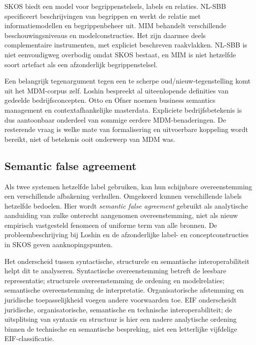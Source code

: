 SKOS biedt een model voor begrippenstelsels, labels en relaties. NL-SBB specificeert beschrijvingen van begrippen en werkt de relatie met informatiemodellen en begrippenbeheer uit. MIM behandelt verschillende beschouwingsniveaus en modelconstructies. Het zijn daarmee deels complementaire instrumenten, met expliciet beschreven raakvlakken. NL-SBB is niet eenvoudigweg overbodig omdat SKOS bestaat, en MIM is niet hetzelfde soort artefact als een afzonderlijk begrippenstelsel. \parencite{S31,S14,S13}

Een belangrijk tegenargument tegen een te scherpe oud/nieuw-tegenstelling komt uit het MDM-corpus zelf. Loshin bespreekt al uiteenlopende definities van gedeelde bedrijfsconcepten. Otto en Ofner noemen business semantics management en contextafhankelijke masterdata. Expliciete bedrijfsbetekenis is dus aantoonbaar onderdeel van sommige eerdere MDM-benaderingen. De resterende vraag is welke mate van formalisering en uitvoerbare koppeling wordt bereikt, niet of betekenis ooit onderwerp van MDM was. \parencite{B01,L20}

\subsection{Semantic false agreement}
Als twee systemen hetzelfde label gebruiken, kan hun schijnbare overeenstemming een verschillende afbakening verhullen. Omgekeerd kunnen verschillende labels hetzelfde bedoelen. Hier wordt \emph{semantic false agreement} gebruikt als analytische aanduiding van zulke onterecht aangenomen overeenstemming, niet als nieuw empirisch vastgesteld fenomeen of uniforme term van alle bronnen. De probleembeschrijving bij Loshin en de afzonderlijke label- en conceptconstructies in SKOS geven aanknopingspunten. \parencite{B01,S31}

Het onderscheid tussen syntactische, structurele en semantische interoperabiliteit helpt dit te analyseren. Syntactische overeenstemming betreft de leesbare representatie; structurele overeenstemming de ordening en modelrelaties; semantische overeenstemming de interpretatie. Organisatorische afstemming en juridische toepasselijkheid voegen andere voorwaarden toe. EIF onderscheidt juridische, organisatorische, semantische en technische interoperabiliteit; de uitsplitsing van syntaxis en structuur is hier een nadere analytische ordening binnen de technische en semantische bespreking, niet een letterlijke vijfdelige EIF-classificatie. \parencite{S43}

